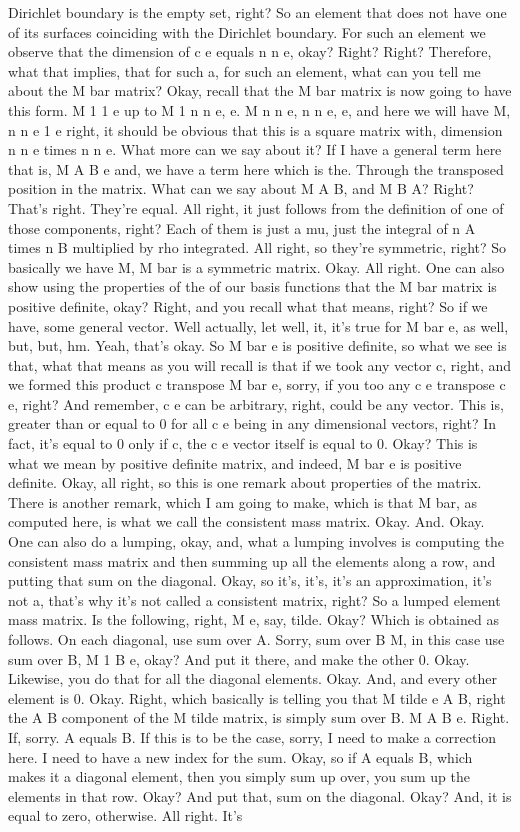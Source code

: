 \documentclass[10pt]{article}
\begin{document}
Dirichlet boundary is the empty set, right? So an element that does not have one of its surfaces coinciding with the Dirichlet boundary. For such an element we observe that the dimension of c e equals n n e, okay? Right? Right? Therefore, what that implies, that for such a, for such an element, what can you tell me about the M bar matrix? Okay, recall that the M bar matrix is now going to have this form. M 1 1 e up to M 1 n n e, e. M n n e, n n e, e, and here we will have M, n n e 1 e right, it should be obvious that this is a square matrix with, dimension n n e times n n e. What more can we say about it? If I have a general term here that is, M A B e and, we have a term here which is the. Through the transposed position in the matrix. What can we say about M A B, and M B A? Right? That's right. They're equal. All right, it just follows from the definition of one of those components, right? Each of them is just a mu, just the integral of n A times n B multiplied by rho integrated. All right, so they're symmetric, right? So basically we have M, M bar is a symmetric matrix. Okay. All right. One can also show using the properties of the of our basis functions that the M bar matrix is positive definite, okay? Right, and you recall what that means, right? So if we have, some general vector. Well actually, let well, it, it's true for M bar e, as well, but, but, hm. Yeah, that's okay. So M bar e is positive definite, so what we see is that, what that means as you will recall is that if we took any vector c, right, and we formed this product c transpose M bar e, sorry, if you too any c e transpose c e, right? And remember, c e can be arbitrary, right, could be any vector. This is, greater than or equal to 0 for all c e being in any dimensional vectors, right? In fact, it's equal to 0 only if c, the c e vector itself is equal to 0. Okay? This is what we mean by positive definite matrix, and indeed, M bar e is positive definite. Okay, all right, so this is one remark about properties of the matrix. There is another remark, which I am going to make, which is that M bar, as computed here, is what we call the consistent mass matrix. Okay. And. Okay. One can also do a lumping, okay, and, what a lumping involves is computing the consistent mass matrix and then summing up all the elements along a row, and putting that sum on the diagonal. Okay, so it's, it's, it's an approximation, it's not a, that's why it's not called a consistent matrix, right? So a lumped element mass matrix. Is the following, right, M e, say, tilde. Okay? Which is obtained as follows. On each diagonal, use sum over A. Sorry, sum over B M, in this case use sum over B, M 1 B e, okay? And put it there, and make the other 0. Okay. Likewise, you do that for all the diagonal elements. Okay. And, and every other element is 0. Okay. Right, which basically is telling you that M tilde e A B, right the A B component of the M tilde matrix, is simply sum over B. M A B e. Right. If, sorry. A equals B. If this is to be the case, sorry, I need to make a correction here. I need to have a new index for the sum. Okay, so if A equals B, which makes it a diagonal element, then you simply sum up over, you sum up the elements in that row. Okay? And put that, sum on the diagonal. Okay? And, it is equal to zero, otherwise. All right. It's 
\end{document}
